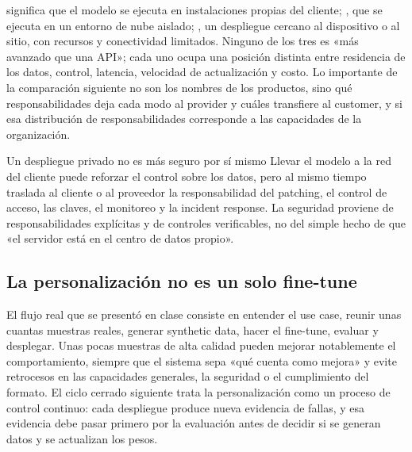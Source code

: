  significa que el modelo se ejecuta en instalaciones propias del cliente; , que se ejecuta en un entorno de nube aislado; , un despliegue cercano al dispositivo o al sitio, con recursos y conectividad limitados. Ninguno de los tres es «más avanzado que una API»; cada uno ocupa una posición distinta entre residencia de los datos, control, latencia, velocidad de actualización y costo. Lo importante de la comparación siguiente no son los nombres de los productos, sino qué responsabilidades deja cada modo al provider y cuáles transfiere al customer, y si esa distribución de responsabilidades corresponde a las capacidades de la organización.


\begin{warningbox}{Un despliegue privado no es más seguro por sí mismo}
Llevar el modelo a la red del cliente puede reforzar el control sobre los datos, pero al mismo tiempo traslada al cliente o al proveedor la responsabilidad del patching, el control de acceso, las claves, el monitoreo y la incident response. La seguridad proviene de responsabilidades explícitas y de controles verificables, no del simple hecho de que «el servidor está en el centro de datos propio».
\end{warningbox}

\subsection{La personalización no es un solo fine-tune}

El flujo real que se presentó en clase consiste en entender el use case, reunir unas cuantas muestras reales, generar synthetic data, hacer el fine-tune, evaluar y desplegar. Unas pocas muestras de alta calidad pueden mejorar notablemente el comportamiento, siempre que el sistema sepa «qué cuenta como mejora» y evite retrocesos en las capacidades generales, la seguridad o el cumplimiento del formato. El ciclo cerrado siguiente trata la personalización como un proceso de control continuo: cada despliegue produce nueva evidencia de fallas, y esa evidencia debe pasar primero por la evaluación antes de decidir si se generan datos y se actualizan los pesos.


